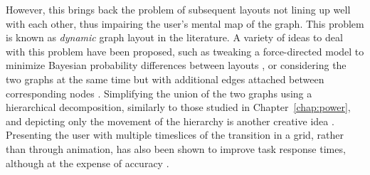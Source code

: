 However, this brings back the problem of subsequent layouts not lining up well with each other, thus impairing the user's mental map \cite{Eades1991, Diehl2001} of the graph. This problem is known as \emph{dynamic} graph layout in the literature.
A variety of ideas to deal with this problem have been proposed, such as tweaking a force-directed model to minimize Bayesian probability differences between layouts \cite{Brandes1997}, or considering the two graphs at the same time but with additional edges attached between corresponding nodes \cite{Erten2003}. Simplifying the union of the two graphs using a hierarchical decomposition, similarly to those studied in Chapter~\ref{chap:power}, and depicting only the movement of the hierarchy is another creative idea \cite{Archambault2009}. Presenting the user with multiple timeslices of the transition in a grid, rather than through animation, has also been shown to improve task response times, although at the expense of accuracy \cite{Archambault2011}.

